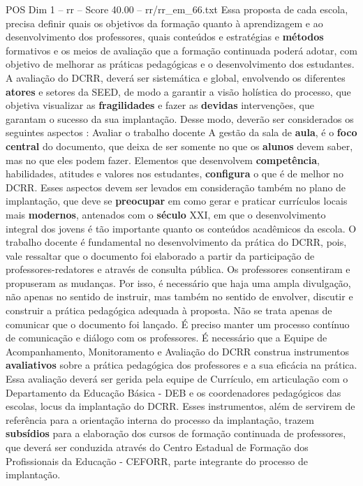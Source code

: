 \begin{textsample}{POS Dim 1 – rr – Score 40.00 – rr/rr\_em\_66.txt}
Essa proposta de cada escola, precisa definir quais os objetivos da formação quanto à aprendizagem e ao desenvolvimento dos professores, quais conteúdos e estratégias e \textbf{métodos} formativos e os meios de avaliação que a formação continuada poderá adotar, com objetivo de melhorar as práticas pedagógicas e o desenvolvimento dos estudantes.
A avaliação do DCRR, deverá ser sistemática e global, envolvendo os diferentes \textbf{atores} e setores da SEED, de modo a garantir a visão holística do processo, que objetiva visualizar as \textbf{fragilidades} e fazer as \textbf{devidas} intervenções, que garantam o sucesso da sua implantação.
Desse modo, deverão ser considerados os seguintes aspectos : Avaliar o trabalho docente A gestão da sala de \textbf{aula}, é o \textbf{foco} \textbf{central} do documento, que deixa de ser somente no que os \textbf{alunos} devem saber, mas no que eles podem fazer.
Elementos que desenvolvem \textbf{competência}, habilidades, atitudes e valores nos estudantes, \textbf{configura} o que é de melhor no DCRR.
Esses aspectos devem ser levados em consideração também no plano de implantação, que deve se \textbf{preocupar} em como gerar e praticar currículos locais mais \textbf{modernos}, antenados com o \textbf{século} XXI, em que o desenvolvimento integral dos jovens é tão importante quanto os conteúdos acadêmicos da escola.
O trabalho docente é fundamental no desenvolvimento da prática do DCRR, pois, vale ressaltar que o documento foi elaborado a partir da participação de professores-redatores e através de consulta pública.
Os professores consentiram e propuseram as mudanças.
Por isso, é necessário que haja uma ampla divulgação, não apenas no sentido de instruir, mas também no sentido de envolver, discutir e construir a prática pedagógica adequada à proposta.
Não se trata apenas de comunicar que o documento foi lançado.
É preciso manter um processo contínuo de comunicação e diálogo com os professores.
É necessário que a Equipe de Acompanhamento, Monitoramento e Avaliação do DCRR construa instrumentos \textbf{avaliativos} sobre a prática pedagógica dos professores e a sua eficácia na prática.
Essa avaliação deverá ser gerida pela equipe de Currículo, em articulação com o Departamento da Educação Básica - DEB e os coordenadores pedagógicos das escolas, locus da implantação do DCRR.
Esses instrumentos, além de servirem de referência para a orientação interna do processo da implantação, trazem \textbf{subsídios} para a elaboração dos cursos de formação continuada de professores, que deverá ser conduzida através do Centro Estadual de Formação dos Profissionais da Educação - CEFORR, parte integrante do processo de implantação.

\end{textsample}
